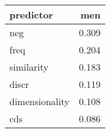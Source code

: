 \begin{tabular}{lr}
\toprule
      predictor &    men \\
\midrule
            neg &  0.309 \\
           freq &  0.204 \\
     similarity &  0.183 \\
          discr &  0.119 \\
 dimensionality &  0.108 \\
            cds &  0.086 \\
\bottomrule
\end{tabular}
